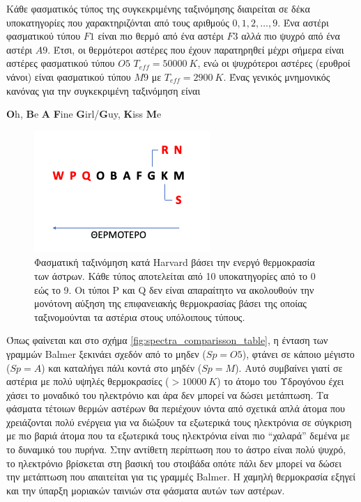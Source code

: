 Κάθε φασματικός τύπος της συγκεκριμένης ταξινόμησης διαιρείται σε δέκα υποκατηγορίες που χαρακτηριζόνται από τους αριθμούς $0,1,2,\dots , 9$. Ένα αστέρι φασματικού τύπου $ F1$ είναι πιο θερμό από ένα αστέρι $ F3$ αλλά πιο ψυχρό από ένα αστέρι $ A9$. Έτσι, οι θερμότεροι αστέρες που έχουν παρατηρηθεί μέχρι σήμερα είναι αστέρες φασματικού τύπου $ O5$ $ T_{eff} = 50000 \ K$, ενώ οι ψυχρότεροι αστέρες (ερυθροί νάνοι) είναι φασματικού τύπου $ M9$ με $ T_{eff} = 2900 \ K$. Ένας γενικός μνημονικός κανόνας για την συγκεκριμένη ταξινόμηση είναι 
\begin{center}
    \textbf{O}h, \textbf{B}e \textbf{A} \textbf{F}ine \textbf{G}irl/\textbf{G}uy, \textbf{K}iss \textbf{M}e
\end{center}


\begin{figure}[h]
    \centering
    \includegraphics[scale=0.6]{Figures/spectral_classes.png}
    \caption{Φασματική ταξινόμηση κατά Harvard βάσει την ενεργό θερμοκρασία των άστρων. Κάθε τύπος αποτελείται από 10 υποκατηγορίες από το 0 εώς το 9. Οι τύποι P και Q δεν είναι απαραίτητο να ακολουθούν την μονότονη αύξηση της επιφανειακής θερμοκρασίας βάσει της οποίας ταξινομούνται τα αστέρια στους υπόλοιπους τύπους.}
    \label{fig:spectral_classes_harvard}
\end{figure}

Όπως φαίνεται και στο σχήμα \ref{fig:spectra_comparisson_table}, η ένταση των γραμμών Balmer ξεκινάει σχεδόν από το μηδεν ($ Sp = O5$), φτάνει σε κάποιο μέγιστο ($ Sp = A$) και καταλήγει πάλι κοντά στο μηδέν ($ Sp = M$). Αυτό συμβαίνει γιατί σε αστέρια με πολύ υψηλές θερμοκρασίες ($ > 10000 \ K$) το άτομο του Υδρογόνου έχει χάσει το μοναδικό του ηλεκτρόνιο και άρα δεν μπορεί να δώσει μετάπτωση. Τα φάσματα τέτοιων θερμών αστέρων θα περιέχουν ιόντα από σχετικά απλά άτομα που χρειάζονται πολύ ενέργεια για να διώξουν τα εξωτερικά τους ηλεκτρόνια σε σύγκριση με πιο βαριά άτομα που τα εξωτερικά τους ηλεκτρόνια είναι πιο ``χαλαρά'' δεμένα με το δυναμικό του πυρήνα.
Στην αντίθετη περίπτωση που το άστρο είναι πολύ ψυχρό, το ηλεκτρόνιο βρίσκεται στη βασική του στοιβάδα οπότε πάλι δεν μπορεί να δώσει την μετάπτωση που απαιτείται για τις γραμμές Balmer. Η χαμηλή θερμοκρασία εξηγεί και την ύπαρξη μοριακών ταινιών στα φάσματα αυτών των αστέρων.\\


